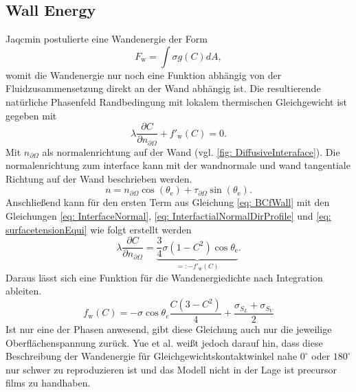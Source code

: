 \subsection{Wall Energy}






Jaqcmin \cite{jacqmin1999CalculationTwoPhaseNavier} postulierte eine Wandenergie der Form
\begin{equation}
    F_{\mathrm{w}}=\int \sigma g(C)dA, 
\end{equation}
womit die Wandenergie nur noch eine Funktion abhängig von der Fluidzusammensetzung direkt an der Wand abhängig ist. Die resultierende natürliche Phasenfeld Randbedingung mit lokalem thermischen Gleichgewicht ist gegeben mit
\begin{equation}
    \label{eq: BCfWall}
    \lambda \frac{\partial C}{\partial n_{\partial \Omega}} + f'_{\mathrm{w}}(C) =0.
\end{equation}
Mit $n_{\partial \Omega}$ als normalenrichtung auf der Wand (vgl. \ref{fig: DiffusiveInteraface}).
Die normalenrichtung zum interface kann mit der wandnormale und wand tangentiale Richtung auf der Wand beschrieben werden. 
\begin{equation}
    \label{eq: InterfaceNormal}
    n=n_{\partial\Omega}\cos{(\theta_{\mathrm{e}})}+\tau_{\partial\Omega}\sin{(\theta_{\mathrm{e}})}.
\end{equation}
Anschließend kann für den ersten Term aus Gleichung \ref{eq: BCfWall} mit den Gleichungen \ref{eq: InterfaceNormal}, \ref{eq: InterfactialNormalDirProfile} und \ref{eq: surfacetensionEqui} wie folgt erstellt werden
\begin{equation}
    \lambda\frac{\partial C}{\partial n_{\partial\Omega}} =\underbrace{\frac{3}{4}\sigma\left(1-C^2\right)\cos\theta_{\mathrm{e}}}_{=:-f'_\mathrm{w}(C)}.
\end{equation}
Daraus lässt sich eine Funktion für die Wandenergiedichte nach Integration ableiten\cite{jacqmin2000ContactlineDynamicsDiffuse}\cite{holzinger2021DirectNumericalSimulation}.
\begin{equation}
    f_{\mathrm{w}}(C)=-\sigma \cos\theta_e \frac{C(3-C^2)}{4} + \frac{\sigma_{S_L}+ \sigma_{S_V}}{2}
\end{equation}
Ist nur eine der Phasen anwesend, gibt diese Gleichung auch nur die jeweilige Oberflächenspannung zurück. Yue et al. \cite{yue2011WallEnergyRelaxation} weißt jedoch darauf hin, dass diese Beschreibung der Wandenergie für Gleichgewichtskontaktwinkel nahe $0^{\circ}$ oder $180^{\circ}$ nur schwer zu reproduzieren ist und das Modell nicht in der Lage ist precursor films zu handhaben. 



